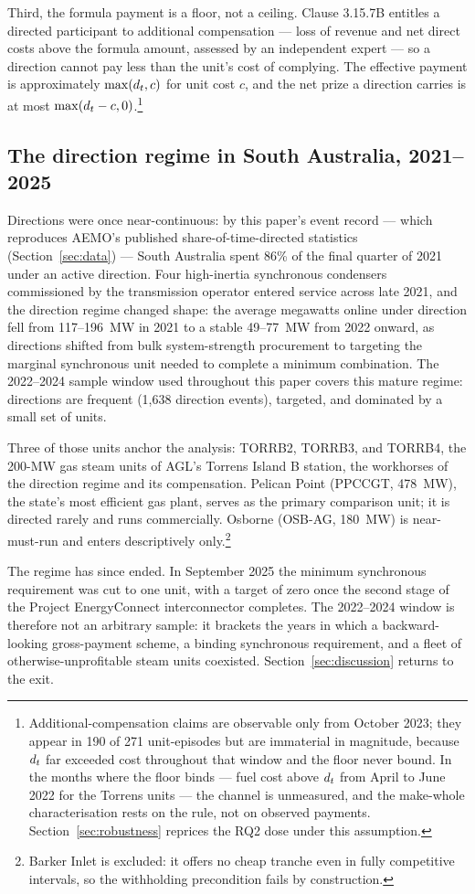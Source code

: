 Third, the formula payment is a floor, not a ceiling. Clause 3.15.7B entitles a
directed participant to additional compensation --- loss of revenue and net
direct costs above the formula amount, assessed by an independent expert --- so
a direction cannot pay less than the unit's cost of complying. The effective
payment is approximately $\max(d_t, c)$ for unit cost $c$, and the net prize a
direction carries is at most $\max(d_t - c, 0)$.\footnote{Additional-compensation
claims are observable only from October 2023; they appear in 190 of 271
unit-episodes but are immaterial in magnitude, because $d_t$ far exceeded cost
throughout that window and the floor never bound. In the months where the floor
binds --- fuel cost above $d_t$ from April to June 2022 for the Torrens units ---
the channel is unmeasured, and the make-whole characterisation rests on the
rule, not on observed payments. Section~\ref{sec:robustness} reprices the RQ2
dose under this assumption.}

\subsection{The direction regime in South Australia, 2021--2025}

Directions were once near-continuous: by this paper's event record ---
which reproduces AEMO's published share-of-time-directed statistics
(Section~\ref{sec:data}) --- South Australia spent 86\% of the final quarter
of 2021 under an active direction. Four high-inertia synchronous
condensers commissioned by the transmission operator entered service across
late 2021, and the direction regime changed shape: the average megawatts online
under direction fell from 117--196~MW in 2021 to a stable 49--77~MW from 2022
onward, as directions shifted from bulk system-strength procurement to
targeting the marginal synchronous unit needed to complete a minimum
combination. The 2022--2024 sample window used throughout this paper covers
this mature regime: directions are frequent (1,638 direction events), targeted,
and dominated by a small set of units.

Three of those units anchor the analysis: TORRB2, TORRB3, and TORRB4, the
200-MW gas steam units of AGL's Torrens Island B station, the workhorses of the
direction regime and its compensation. Pelican Point (PPCCGT, 478~MW), the
state's most efficient gas plant, serves as the primary comparison unit; it is
directed rarely and runs commercially. Osborne (OSB-AG, 180~MW) is
near-must-run and enters descriptively only.\footnote{Barker Inlet is excluded:
it offers no cheap tranche even in fully competitive intervals, so the
withholding precondition fails by construction.}

The regime has since ended. In September 2025 the minimum synchronous
requirement was cut to one unit, with a target of zero once the second stage of
the Project EnergyConnect interconnector completes. The 2022--2024 window is
therefore not an arbitrary sample: it brackets the years in which a
backward-looking gross-payment scheme, a binding synchronous requirement, and a
fleet of otherwise-unprofitable steam units coexisted. Section~\ref{sec:discussion}
returns to the exit.
